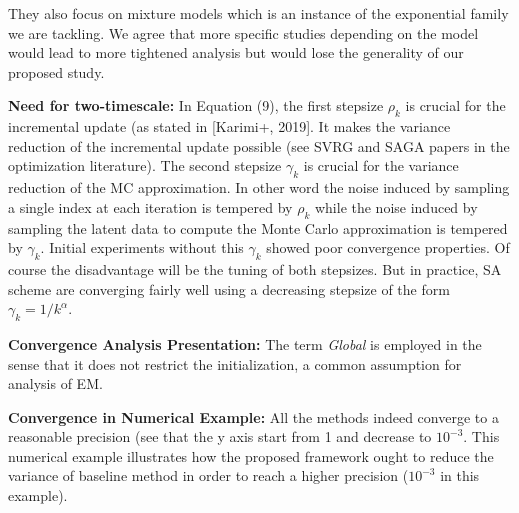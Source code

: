 \documentclass{article}
\begin{document}
They also focus on mixture models which is an instance of the exponential family we are tackling.
We agree that more specific studies depending on the model would lead to more tightened analysis but would lose the generality of our proposed study.


\textbf{Need for two-timescale:}
In Equation (9), the first stepsize $\rho_k$ is crucial for the incremental update (as stated in [Karimi+, 2019]. It makes the variance reduction of the incremental update possible (see SVRG and SAGA papers in the optimization literature).
The second stepsize $\gamma_k$ is crucial for the variance reduction of the MC approximation. In other word the noise induced by sampling a single index at each iteration is tempered by $\rho_k$ while the noise induced by sampling the latent data to compute the Monte Carlo approximation is tempered by $\gamma_k$. Initial experiments without this $\gamma_k$ showed poor convergence properties.
Of course the disadvantage will be the tuning of both stepsizes. But in practice, SA scheme are converging fairly well using a decreasing stepsize of the form $\gamma_k = 1/k^{\alpha}$.


\textbf{Convergence Analysis Presentation:}
The term \emph{Global} is employed in the sense that it does not restrict the initialization, a common assumption for analysis of EM.

\textbf{Convergence in Numerical Example:}
All the methods indeed converge to a reasonable precision (see that the y axis start from 1 and decrease to $10^{-3}$.
This numerical example illustrates how the proposed framework ought to reduce the variance of baseline method in order to reach a higher precision ($10^{-3}$ in this example).
\end{document}
